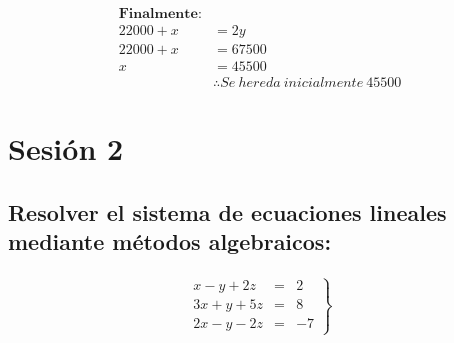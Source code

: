 \documentclass[11pt, a4paper]{article}
\begin{document}
\begin{align*}
  \textbf{Finalmente:}\\
  22000 + x &= 2y \\
  22000 + x &= 67500 \\
  x &= 45500\\
  & \therefore Se\ hereda\ inicialmente\ 45500
\end{align*}
\newpage
{}
\section{Sesión 2}
\subsection{Resolver el sistema de ecuaciones lineales mediante métodos algebraicos:}
\vspace{-1cm}
\begin{align*}
  \left.
    \begin{array}{rcl}
      x-y+2z &= &2\\
      3x+y+5z &= &8\\
      2x-y-2z &= &-7
    \end{array}
  \right\}
\end{align*}
\end{document}

